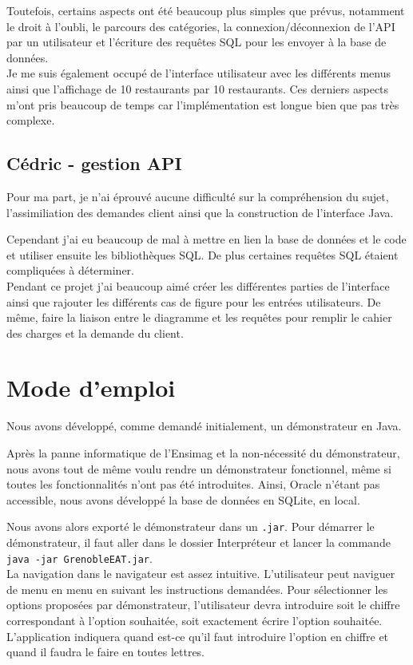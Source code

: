 \documentclass[10pt, a4paper]{article}
\begin{document}
Toutefois, certains aspects ont été beaucoup plus simples que prévus, notamment le droit à l'oubli,
le parcours des catégories, la connexion/déconnexion de l'API par un utilisateur et l'écriture
des requêtes SQL pour les envoyer à la base de données.\\

Je me suis également occupé de l'interface utilisateur avec les différents menus ainsi que l'affichage
de 10 restaurants par 10 restaurants. Ces derniers aspects m'ont pris beaucoup de temps car
l'implémentation est longue bien que pas très complexe.

\subsection{Cédric - gestion API}
Pour ma part, je n'ai éprouvé aucune difficulté sur la compréhension du sujet, l'assimiliation
des demandes client ainsi que la construction de l'interface Java.

Cependant j'ai eu beaucoup de mal à mettre en lien la base de données et le code et utiliser ensuite
les bibliothèques SQL. De plus certaines requêtes SQL étaient compliquées à déterminer.\\

Pendant ce projet j'ai beaucoup aimé créer les différentes parties de l'interface ainsi
que rajouter les différents cas de figure pour les entrées utilisateurs. De même, faire la liaison
entre le diagramme et les requêtes pour remplir le cahier des charges et la demande du client.

\section{Mode d'emploi}

Nous avons développé, comme demandé initialement, un démonstrateur en Java.

Après la panne informatique de l'Ensimag et la non-nécessité du démonstrateur, nous avons tout de même voulu
rendre un démonstrateur fonctionnel, même si toutes les fonctionnalités n'ont pas été introduites. Ainsi, Oracle n'étant pas accessible,
nous avons développé la base de données en SQLite, en local.

Nous avons alors exporté le démonstrateur dans un \texttt{.jar}. Pour démarrer le démonstrateur, il faut aller
dans le dossier Interpréteur et lancer la commande \texttt{java -jar GrenobleEAT.jar}. \\


La navigation dans le navigateur est assez intuitive. L'utilisateur peut naviguer de menu en menu en suivant
les instructions demandées. Pour sélectionner les options proposées par  démonstrateur, l'utilisateur devra
introduire soit le chiffre correspondant à l'option souhaitée, soit exactement écrire l'option souhaitée.
L'application indiquera quand est-ce qu'il faut introduire l'option en chiffre et quand il faudra le faire en toutes lettres. \\
\end{document}
